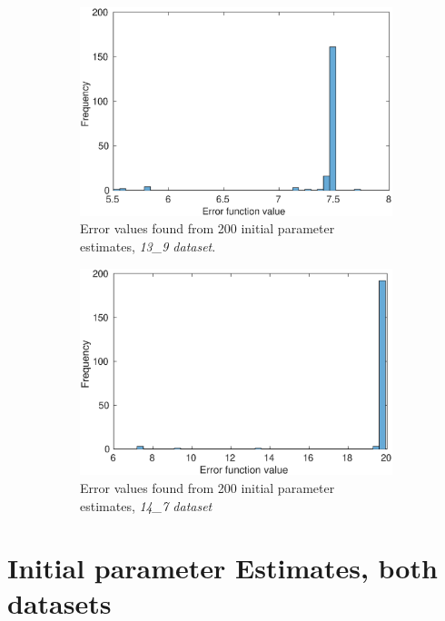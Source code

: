 \documentclass[10pt,journal]{./IEEE_latex_class/IEEEtran}
\begin{document}
\begin{figure}[H]
    \begin{subfigure}[c]{\textwidth}
    \centering
        \includegraphics[scale = 0.5]{13_9_f_hist}
        \caption{Error values found from 200 initial parameter estimates, \textit{13\_9 dataset}.}
    \end{subfigure}
    
    \begin{subfigure}[c]{\textwidth}
    \centering
        \includegraphics[scale = 0.5]{14_7_f_hist}
        \caption{Error values found from 200 initial parameter estimates, \textit{14\_7 dataset}}
    \end{subfigure}
    \caption{}
\label{hist_f}
\end{figure} 

\section{Initial parameter Estimates, both datasets}
\label{Bothdatasetfitting}
\setcounter{figure}{0} 
\end{document}

